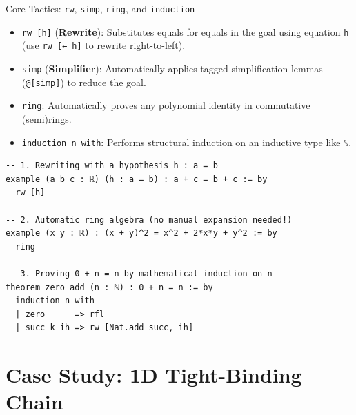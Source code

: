\documentclass[aspectratio=169, 10pt]{beamer}
\begin{document}
\begin{frame}[fragile]{Core Tactics: \texttt{rw}, \texttt{simp}, \texttt{ring}, and \texttt{induction}}
  \begin{itemize}
    \item \texttt{rw [h]} (\textbf{Rewrite}): Substitutes equals for equals in the goal using equation \texttt{h} (use \texttt{rw [← h]} to rewrite right-to-left).
    \item \texttt{simp} (\textbf{Simplifier}): Automatically applies tagged simplification lemmas (\texttt{@[simp]}) to reduce the goal.
    \item \texttt{ring}: Automatically proves any polynomial identity in commutative (semi)rings.
    \item \texttt{induction n with}: Performs structural induction on an inductive type like \texttt{ℕ}.
  \end{itemize}

  \vspace{0.1cm}
\begin{lstlisting}[language=Lean4]
-- 1. Rewriting with a hypothesis h : a = b
example (a b c : ℝ) (h : a = b) : a + c = b + c := by
  rw [h]

-- 2. Automatic ring algebra (no manual expansion needed!)
example (x y : ℝ) : (x + y)^2 = x^2 + 2*x*y + y^2 := by
  ring

-- 3. Proving 0 + n = n by mathematical induction on n
theorem zero_add (n : ℕ) : 0 + n = n := by
  induction n with
  | zero      => rfl
  | succ k ih => rw [Nat.add_succ, ih]
\end{lstlisting}
\end{frame}

\section{Case Study: 1D Tight-Binding Chain}
\end{document}

